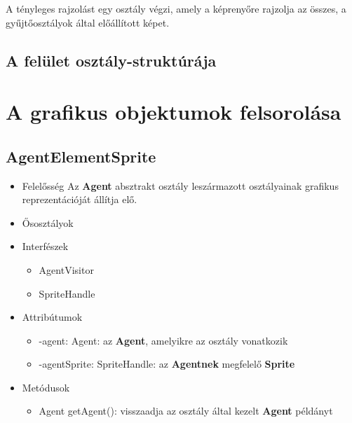 \noindent A tényleges rajzolást egy osztály végzi, amely a képrenyőre rajzolja az összes, a gyűjtőosztályok által előállított képet.

\subsection{A felület osztály-struktúrája}

\section{A grafikus objektumok felsorolása}

\subsection{AgentElementSprite}
\begin{itemize}
\item Felelősség \newline
    Az \textbf{Agent} absztrakt osztály leszármazott osztályainak grafikus reprezentációját állítja elő.
\item Ősosztályok
\item Interfészek
    \begin{itemize}
        \item AgentVisitor
        \item SpriteHandle
    \end{itemize}
\item Attribútumok
    \begin{itemize}
        \item -agent: Agent: az \textbf{Agent}, amelyikre az osztály vonatkozik
        \item -agentSprite: SpriteHandle: az \textbf{Agentnek} megfelelő \textbf{Sprite}
    \end{itemize}
\item Metódusok
	\begin{itemize}
        \item Agent getAgent(): visszaadja az osztály által kezelt \textbf{Agent} példányt
	\end{itemize}
\end{itemize}

